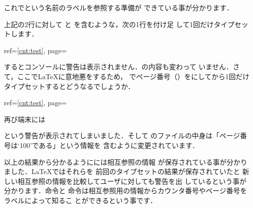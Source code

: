 \begin{InTeX}
\relax
{}
\end{InTeX}


これでという名前のラベルを参照する準備が
できている事が分かります．

\begin{InTeX}
 \thetest
{} \thetest \label{cnt:test}
\end{InTeX}

上記の2行に対して  と を含むような，次の1行を付け足
して1回だけタイプセットします．

\begin{InTeX}
ref=\ref{cnt:test}, page=\pageref{cnt:test}
\end{InTeX}

するとコンソールに警告は表示されません．の内容も変わって
いません．さて，ここで{\LaTeX}に意地悪をするため，
でページ番号（）をにしてから1回だけ
タイプセットするとどうなるでしょうか．

\begin{InTeX}
\setcounter{page}{100}
 \thetest
{} \thetest \label{cnt:test}
ref=\ref{cnt:test}, page=\pageref{cnt:test}
\end{InTeX}

再び端末には
\begin{flushleft}
\end{flushleft}
という警告が表示されてしまいました．そして
のファイルの中身は「ページ番号は`100'である」という情報を
含むように変更されています．

\begin{InTeX}
\relax
{} 
\end{InTeX}



以上の結果から分かるようにには相互参照の情報%
が保存されている事が分かりました．{\LaTeX}ではそれらを
前回のタイプセットの結果が保存されていたと
新しい相互参照の情報を比較してユーザに対しても警告を出
しているという事が分かります．命令と 
命令は相互参照用の情報からカウンタ番号やページ番号をラベルによって知るこ
とができるという事です．%

